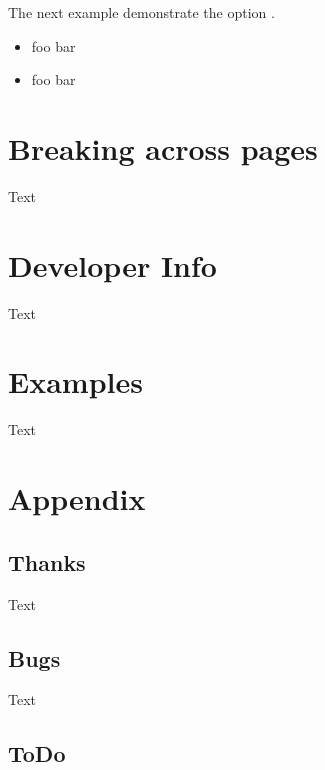 \documentclass[openany,12pt,tocdepth=3]{ltx-md}
\begin{document}
The next example demonstrate the option .
\begin{center}
\captionsetup{format=plain}
\noindent\begin{minipage}[t]{0.5\linewidth}
\begin{ltxexample}[caption={Example\newline \Opt{ignore-last-skip}\Opt{=true}},result=true,xframed={margin=5pt}]
\begin{xframed}
  \begin{itemize}
   \item foo bar
 \end{itemize}
\end{xframed}
\end{ltxexample}
\end{minipage}%
\begin{minipage}[t]{0.5\linewidth}
\begin{ltxexample}[caption={Example \newline\Opt{ignore-last-skip}\Opt{=false}},result=true,xframed={margin=5pt}]
\begin{xframed}
  \begin{itemize}
   \item foo bar
 \end{itemize}
\end{xframed}
\end{ltxexample}
\end{minipage}
\end{center}



\chapter{Breaking across pages}\label{chap:break}
Text 

\chapter{Developer Info}\label{chap:developer-info}

Text 
\chapter{Examples}\label{chap:examples}
Text 

\appendix
\chapter{Appendix}\label{chap:appendix}
\section{Thanks}
Text 
\section{Bugs}
Text 

\section{ToDo}
\end{document}
